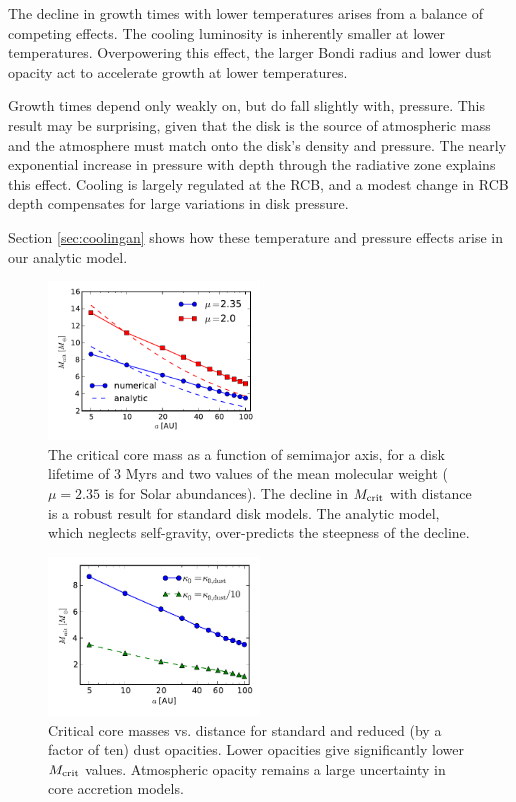 \documentclass[apj, numberedappendix]{emulateapj}
\newcommand{\MC}{M_{\rm crit}}
\begin{document}
The decline in growth times with lower temperatures arises from a balance of competing effects.  The cooling luminosity is inherently smaller at lower temperatures.  Overpowering this effect, the larger Bondi radius and lower dust opacity act to accelerate growth at lower temperatures.

Growth times depend only weakly on, but do fall slightly with, pressure.   This result may be surprising, given that the disk is the source of atmospheric mass and the atmosphere must match onto the disk's density and pressure.  The nearly exponential increase in pressure with depth through the radiative zone explains this effect.  Cooling is largely regulated at the RCB, and a modest change in RCB depth compensates for large variations in disk pressure.

Section \ref{sec:coolingan} shows how these temperature and pressure effects arise in our analytic model.


\begin{figure}[htb]
\centering
\includegraphics[width=0.5\textwidth]{../../figs/ModelAtmospheres/RadSelfGravPoly/PaperFigs/Mcrit_vs_a_3Myrs_new.pdf}
\caption{The critical core mass as a function of semimajor axis, for a disk lifetime of $3$ Myrs and two values of the mean molecular weight ($\mu = 2.35$ is for Solar abundances). The decline in $\MC$ with distance is a robust result for standard disk models.  The analytic model, which neglects self-gravity, over-predicts the steepness of the decline.}
\label{fig:Mcvsa}
\end{figure}

\begin{figure}[htb]
\centering
\includegraphics[width=0.5\textwidth]{../../figs/ModelAtmospheres/RadSelfGravPoly/PaperFigs/Mcrit_vs_a_3Myrs_opacity.pdf}
\caption{Critical core masses vs. distance for standard and reduced (by a factor of ten) dust opacities.  Lower opacities give significantly lower $\MC$ values.  Atmospheric opacity remains a large uncertainty in core accretion models.}
\label{fig:Mcritopacity}
\end{figure}
\end{document}
